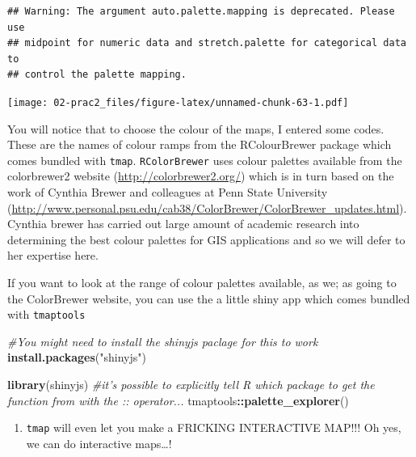 \documentclass[]{book}
\newenvironment{Shaded}{\begin{snugshade}}{\end{snugshade}}
\newcommand{\CommentTok}[1]{\textcolor[rgb]{0.56,0.35,0.01}{\textit{#1}}}
\newcommand{\KeywordTok}[1]{\textcolor[rgb]{0.13,0.29,0.53}{\textbf{#1}}}
\newcommand{\NormalTok}[1]{#1}
\newcommand{\OperatorTok}[1]{\textcolor[rgb]{0.81,0.36,0.00}{\textbf{#1}}}
\newcommand{\StringTok}[1]{\textcolor[rgb]{0.31,0.60,0.02}{#1}}
\providecommand{\tightlist}{%
  \setlength{\itemsep}{0pt}\setlength{\parskip}{0pt}}
\begin{document}
\begin{verbatim}
## Warning: The argument auto.palette.mapping is deprecated. Please use
## midpoint for numeric data and stretch.palette for categorical data to
## control the palette mapping.
\end{verbatim}

\texttt{[image: 02-prac2\_files/figure-latex/unnamed-chunk-63-1.pdf]}

You will notice that to choose the colour of the maps, I entered some codes. These are the names of colour ramps from the RColourBrewer package which comes bundled with \texttt{tmap}. \texttt{RColorBrewer} uses colour palettes available from the colorbrewer2 website (\url{http://colorbrewer2.org/}) which is in turn based on the work of Cynthia Brewer and colleagues at Penn State University (\url{http://www.personal.psu.edu/cab38/ColorBrewer/ColorBrewer_updates.html}). Cynthia brewer has carried out large amount of academic research into determining the best colour palettes for GIS applications and so we will defer to her expertise here.

If you want to look at the range of colour palettes available, as we; as going to the ColorBrewer website, you can use the a little shiny app which comes bundled with \texttt{tmaptools}

\begin{Shaded}
\begin{Highlighting}[]
\CommentTok{#You might need to install the shinyjs paclage for this to work}
\KeywordTok{install.packages}\NormalTok{(}\StringTok{"shinyjs"}\NormalTok{)}
\end{Highlighting}
\end{Shaded}

\begin{Shaded}
\begin{Highlighting}[]
\KeywordTok{library}\NormalTok{(shinyjs)}
\CommentTok{#it's possible to explicitly tell R which package to get the function from with the :: operator...}
\NormalTok{tmaptools}\OperatorTok{::}\KeywordTok{palette_explorer}\NormalTok{()}
\end{Highlighting}
\end{Shaded}

\begin{enumerate}
\def\labelenumi{\arabic{enumi}.}
\setcounter{enumi}{12}
\tightlist
\item
  \texttt{tmap} will even let you make a FRICKING INTERACTIVE MAP!!! Oh yes, we can do interactive maps\ldots{}!
\end{enumerate}
\end{document}
